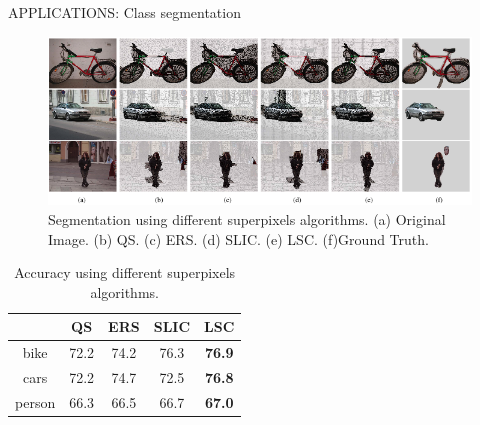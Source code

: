 \documentclass[10pt]{beamer}
\begin{document}
\begin{frame}{APPLICATIONS: Class segmentation}
    \begin{figure}[htbp]
        \centering
        \includegraphics[width = 1 \linewidth]{images/paper2/superpixelAlgo.png}
        \centering
        \caption{Segmentation using different superpixels algorithms. (a) Original Image. (b) QS. (c) ERS. (d) SLIC. (e) LSC. (f)Ground Truth.}
        \label{fig: superpixelSegmentation}
    \end{figure}

    \begin{table}[h!]
        \centering
        \begin{adjustbox}{max width=4cm}
        \begin{tabular}{*{5}{|c}|}%
            \hline
            & QS & ERS & SLIC & LSC\\
            \hline
            bike & 72.2 & 74.2 & 76.3 & \bfseries{76.9}\\
            cars & 72.2 & 74.7 & 72.5 & \bfseries{76.8}\\
            person & 66.3 & 66.5 & 66.7 & \bfseries{67.0}\\
            \hline
        \end{tabular}
        \end{adjustbox}
        \caption{Accuracy using different superpixels algorithms.}
        \label{table accuracy}
    \end{table}
\end{frame}
\end{document}
